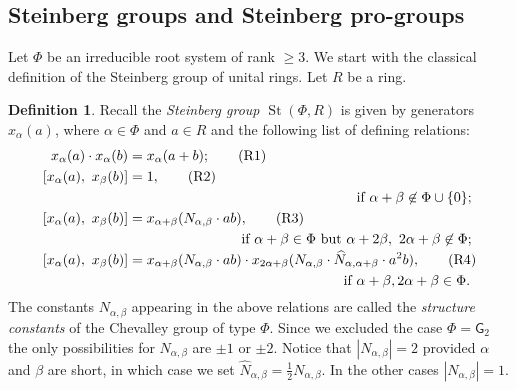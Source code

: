 \documentclass{article}
\theoremstyle{definition}
\newtheorem{df}[lemma]{Definition} \Crefname{df}{Definition}{Definitions}
\theoremstyle{remark}
\DeclareMathOperator\St{St}
\begin{document}
\subsection{Steinberg groups and Steinberg pro-groups}
Let $\Phi$ be an irreducible root system of rank $\geq 3$.
We start with the classical definition of the Steinberg group of unital rings.
Let $R$ be a ring.
\begin{df} \label{def:Steinberg}
Recall the {\it Steinberg group $\St(\Phi, R)$} is given by generators $x_\alpha(a)$, where $\alpha \in \Phi$ and $a \in R$ and the following list of defining relations:
\begin{align}
 x_\alpha(a) \cdot x_\alpha(b)    &= x_\alpha(a+b); \tag{R1} \label{R1} \\
 [x_\alpha(a),\ x_\beta(b)] &= 1, \tag{R2} \label{R2} \\ 
 \multispan2{\hfil if $\alpha + \beta \not\in\Phi \cup \{0\};$} \nonumber \\
 [x_\alpha(a),\ x_\beta(b)] &= x_{\alpha + \beta}(N_{\alpha,\beta} \cdot ab), \tag{R3} \label{R3} \\
 \multispan2{\hfill if $\alpha+\beta\in\Phi$ but $\alpha+2\beta,\ 2\alpha+\beta\not\in\Phi;$} \nonumber \\
 [x_\alpha(a),\ x_\beta(b)] &= x_{\alpha + \beta}(N_{\alpha,\beta} \cdot ab) \cdot x_{2\alpha+\beta}(N_{\alpha,\beta} \cdot \widehat{N}_{\alpha, \alpha+\beta}\cdot a^2b), \tag{R4} \label{R4} \\ \multispan2{ \hfill if $\alpha+\beta,2\alpha+\beta\in\Phi$.} \nonumber  \end{align}
The constants $N_{\alpha,\beta}$ appearing in the above relations are called the {\it structure constants} of the Chevalley group of type $\Phi$.
Since we excluded the case $\Phi=\mathsf{G}_2$ the only possibilities for $N_{\alpha, \beta}$ are $\pm 1$ or $\pm 2$.
Notice that $|N_{\alpha,\beta}| = 2$ provided $\alpha$ and $\beta$ are short, in which case we set $\widehat{N}_{\alpha, \beta} = \frac{1}{2} N_{\alpha, \beta}$.
In the other cases $|N_{\alpha, \beta}| = 1$. \end{df}
\end{document}
